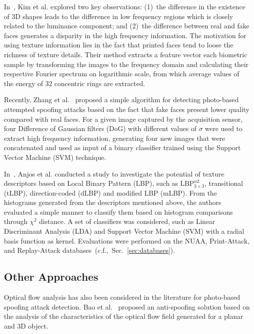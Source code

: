 \documentclass[journal]{IEEEtran}
\providecommand{\rv}[1]{{\protect\color{black}{#1}}}
\begin{document}
In~\cite{Kim:ICB:2012}, Kim et al. explored two key observations: (1)~the difference in the existence of 3D shapes leads to the difference in low frequency regions which is closely related to the luminance component; and (2)~the difference between real and fake faces generates a disparity in the high frequency information. The motivation for using texture information lies in the fact that printed faces tend to loose the richness of texture details. Their method extracts a feature vector \rv{from} each biometric sample by transforming the images to the frequency domain and calculating their respective Fourier spectrum on logarithmic scale, from which average values of the energy of $32$ concentric rings are extracted. 

Recently, Zhang et al.~\cite{Zhang:ICB:2012} proposed a simple algorithm for detecting photo-based attempted spoofing attacks based on the fact that fake faces present lower quality compared with real faces. For a given image captured by the acquisition sensor, four Difference of Gaussian filters (DoG) with different values of $\sigma$ were used to extract high frequency information, generating four new images that were concatenated and used as input of a binary classifier trained using the Support Vector Machine (SVM) technique.

In~\cite{Chingovska:BIOSEG:2012}, Anjos et al. conducted a study to investigate the potential of texture descriptors based on Local Binary Pattern (LBP), such as $\textrm{LBP}^{u2}_{3 \times 3}$, transitional (tLBP), direction-coded (dLBP) and modified LBP (mLBP). From the histograms generated from the descriptors mentioned above, the authors evaluated a simple manner to classify them based on histogram comparisons through $\chi^{2}$ distance. A set of classifiers was considered, such as Linear Discriminant Analysis (LDA) and Support Vector Machine (SVM) with a radial basis function as kernel. Evaluations were performed on the NUAA, Print-Attack, and Replay-Attack databases~(c.f.,~Sec.~\ref{sec:databases}).


\subsection{Other Approaches}

Optical flow analysis has also been considered in the literature for photo-based spoofing attack detection. Bao et al.~\cite{Bao:ICIASP:2009} proposed an anti-spoofing solution based on the analysis of the characteristics of the optical flow field generated for a planar and 3D object. 
\end{document}
